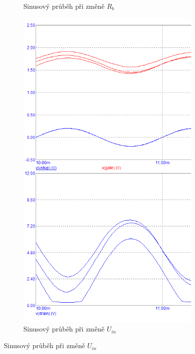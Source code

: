 \documentclass{article}
\begin{document}
\begin{figure}[H]
\begin{minipage}[t]{0.33\textwidth}
\begin{figure}[H]
      \caption{\label{NUI_Tranzient_2} Sinusový průběh při změně \(R_b\)}
    \end{figure}
  \end{minipage}
  \hfill
  \begin{minipage}[t]{0.35\textwidth}
    \begin{figure}[H]
      \includegraphics[width=\textwidth]{PC/UNI/posun_prac_podu.png}
      \caption{\label{Posun_prac_bodu} Sinusový průběh při změně \(U_{in}\)}
    \end{figure}
  \end{minipage}
\end{figure}
\end{document}
